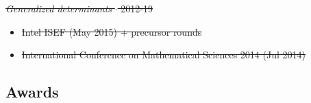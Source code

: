 \documentclass{article}
\newcommand{\disown}[1]{\sout{#1}}
\newcommand{\archive}{\color{lightgray}}
\begin{document}
\begin{itemize}
{    \item \disown{\emph{Generalized determinants} $\cdot$ 2012-19}
    \begin{itemize}
        \item \disown{Intel ISEF (May 2015) + precursor rounds}
        \item \disown{International Conference on Mathematical Sciences 2014 (Jul 2014)}

    \end{itemize}

}

\end{itemize}

{\archive

\subsection*{Awards}

}
\end{document}
